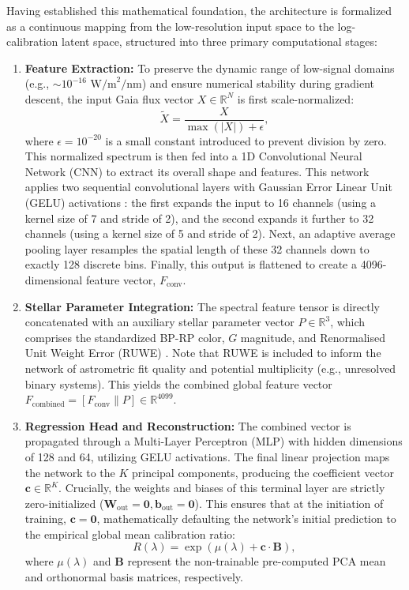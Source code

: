 \documentclass{aa}
\begin{document}
Having established this mathematical foundation, the architecture is formalized as a continuous mapping from the low-resolution input space to the log-calibration latent space, structured into three primary computational stages:

\begin{enumerate}[itemsep=0.25cm]
    \item \textbf{Feature Extraction:} To preserve the dynamic range of low-signal domains (e.g., $\sim 10^{-16}\text{ W/m}^2\text{/nm}$) and ensure numerical stability during gradient descent, the input Gaia flux vector $X \in \mathbb{R}^{N}$ is first scale-normalized:
    \begin{equation}
        \tilde{X} = \frac{X}{\max(|X|) + \epsilon},
    \end{equation}
    where $\epsilon = 10^{-20}$ is a small constant introduced to prevent division by zero. This normalized spectrum is then fed into a 1D Convolutional Neural Network (CNN) to extract its overall shape and features. This network applies two sequential convolutional layers with Gaussian Error Linear Unit (GELU) activations \citep{hendrycks2016gelu}: the first expands the input to 16 channels (using a kernel size of 7 and stride of 2), and the second expands it further to 32 channels (using a kernel size of 5 and stride of 2). Next, an adaptive average pooling layer resamples the spatial length of these 32 channels down to exactly 128 discrete bins. Finally, this output is flattened to create a 4096-dimensional feature vector, $F_{\text{conv}}$.
    
    \item \textbf{Stellar Parameter Integration:} The spectral feature tensor is directly concatenated with an auxiliary stellar parameter vector $P \in \mathbb{R}^{3}$, which comprises the standardized BP-RP color, $G$ magnitude, and Renormalised Unit Weight Error (RUWE) \citep{riello2021}. Note that RUWE is included to inform the network of astrometric fit quality and potential multiplicity (e.g., unresolved binary systems). This yields the combined global feature vector $F_{\text{combined}} = [F_{\text{conv}} \parallel P] \in \mathbb{R}^{4099}$.

    \item \textbf{Regression Head and Reconstruction:} The combined vector is propagated through a Multi-Layer Perceptron (MLP) with hidden dimensions of 128 and 64, utilizing GELU activations. The final linear projection maps the network to the $K$ principal components, producing the coefficient vector $\mathbf{c} \in \mathbb{R}^{K}$. Crucially, the weights and biases of this terminal layer are strictly zero-initialized ($\mathbf{W}_{\text{out}} = \mathbf{0}, \mathbf{b}_{\text{out}} = \mathbf{0}$). This ensures that at the initiation of training, $\mathbf{c} = \mathbf{0}$, mathematically defaulting the network's initial prediction to the empirical global mean calibration ratio:
    \begin{equation}
        R(\lambda) = \exp\left( \mu(\lambda) + \mathbf{c} \cdot \mathbf{B} \right),
    \end{equation}
    where $\mu(\lambda)$ and $\mathbf{B}$ represent the non-trainable pre-computed PCA mean and orthonormal basis matrices, respectively.
    

\end{enumerate}
\end{document}
